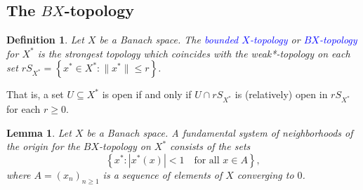 \documentclass[11pt]{article}
\theoremstyle{thmstyle}
\newtheorem{lemma}[theorem]{Lemma}
\theoremstyle{defstyle}
\newtheorem{definition}[theorem]{Definition}
\newcommand{\define}[1]{\textcolor{blue}{\textit{#1}}}
\renewcommand{\le}{\leqslant}
\renewcommand{\ge}{\geqslant}
\begin{document}
\subsection{The \texorpdfstring{$BX$}{BX}-topology}

\begin{definition}
    Let $X$ be a Banach space. The \define{bounded $X$-topology} or \define{$BX$-topology} for $X^\ast$ is the strongest topology which coincides with the weak*-topology on each set $rS_{X^\ast} = \left\{x^\ast\in X^\ast\colon \|x^\ast\|\le r\right\}$.
\end{definition}

That is, a set $U\subseteq X^\ast$ is open if and only if $U\cap rS_{X^\ast}$ is (relatively) open in $rS_{X^\ast}$ for each $r\ge 0$.

\begin{lemma}
    Let $X$ be a Banach space. A \emph{fundamental system of neighborhoods} of the origin for the $BX$-topology on $X^\ast$ consists of the sets 
    \begin{equation*}
        \left\{x^\ast\colon |x^\ast(x)| < 1\quad\text{for all }x\in A\right\},
    \end{equation*}
    where $A = (x_n)_{n\ge 1}$ is a sequence of elements of $X$ converging to $0$.
\end{lemma}
\end{document}
